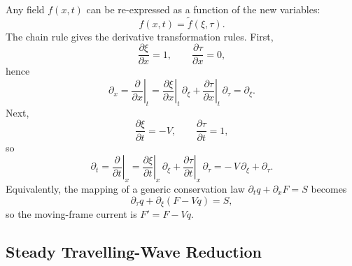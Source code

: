 \documentclass[11pt]{article}
\begin{document}
Any field $f(x,t)$ can be re-expressed as a function of the new variables:
\begin{equation}
f(x,t) = \tilde f(\xi,\tau).
\end{equation}
The chain rule gives the derivative transformation rules. First,
\begin{equation}
\frac{\partial \xi}{\partial x}=1, \qquad \frac{\partial \tau}{\partial x}=0,
\end{equation}
hence
\begin{equation}
\boxed{
\partial_x
=
\left.\frac{\partial}{\partial x}\right|_{t}
=
\left.\frac{\partial \xi}{\partial x}\right|_{t}\,\partial_\xi
+
\left.\frac{\partial \tau}{\partial x}\right|_{t}\,\partial_\tau
=
\partial_\xi.
}
\end{equation}
Next,
\begin{equation}
\frac{\partial \xi}{\partial t}=-V, \qquad \frac{\partial \tau}{\partial t}=1,
\end{equation}
so
\begin{equation}
\boxed{
\partial_t
=
\left.\frac{\partial}{\partial t}\right|_{x}
=
\left.\frac{\partial \xi}{\partial t}\right|_{x}\,\partial_\xi
+
\left.\frac{\partial \tau}{\partial t}\right|_{x}\,\partial_\tau
=
-\,V\,\partial_\xi+\partial_\tau.
}
\end{equation}
Equivalently, the mapping of a generic conservation law
$\partial_t q + \partial_x F = S$ becomes
\begin{equation}
\partial_\tau q + \partial_\xi\!\left(F - V q\right)=S,
\end{equation}
so the moving-frame current is $F' = F - Vq$.

\subsection*{Steady Travelling-Wave Reduction}
\end{document}
